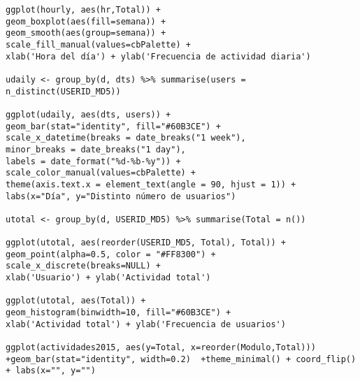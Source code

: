 \begin{lstlisting}
ggplot(hourly, aes(hr,Total)) +
geom_boxplot(aes(fill=semana)) +
geom_smooth(aes(group=semana)) +
scale_fill_manual(values=cbPalette) +
xlab('Hora del día') + ylab('Frecuencia de actividad diaria')

udaily <- group_by(d, dts) %>% summarise(users = n_distinct(USERID_MD5))

ggplot(udaily, aes(dts, users)) +
geom_bar(stat="identity", fill="#60B3CE") +
scale_x_datetime(breaks = date_breaks("1 week"),
minor_breaks = date_breaks("1 day"),
labels = date_format("%d-%b-%y")) +
scale_color_manual(values=cbPalette) +
theme(axis.text.x = element_text(angle = 90, hjust = 1)) +
labs(x="Día", y="Distinto número de usuarios")

utotal <- group_by(d, USERID_MD5) %>% summarise(Total = n())

ggplot(utotal, aes(reorder(USERID_MD5, Total), Total)) +
geom_point(alpha=0.5, color = "#FF8300") +
scale_x_discrete(breaks=NULL) +
xlab('Usuario') + ylab('Actividad total')

ggplot(utotal, aes(Total)) +
geom_histogram(binwidth=10, fill="#60B3CE") +
xlab('Actividad total') + ylab('Frecuencia de usuarios')

ggplot(actividades2015, aes(y=Total, x=reorder(Modulo,Total))) +geom_bar(stat="identity", width=0.2)  +theme_minimal() + coord_flip() + labs(x="", y="")

\end{lstlisting}	
	
